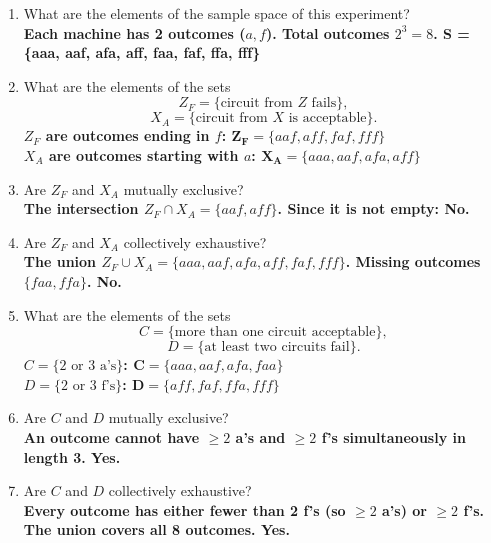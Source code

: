 \documentclass{article}
\begin{document}
\begin{enumerate}[label=(\alph*)]
    \item What are the elements of the sample space of this experiment? \\[1em]
    {\boldmath\textbf{Each machine has 2 outcomes ($a, f$). Total outcomes $2^3 = 8$. S = \{aaa, aaf, afa, aff, faa, faf, ffa, fff\}}}
    
    \item What are the elements of the sets
    \[ Z_F = \{ \text{circuit from } Z \text{ fails} \}, \]
    \[ X_A = \{ \text{circuit from } X \text{ is acceptable} \}. \]
    \vspace{1em}
    {\boldmath\textbf{$Z_F$ are outcomes ending in $f$: $\mathbf{Z_F} = \{aaf, aff, faf, fff\}$}} \\
    {\boldmath\textbf{$X_A$ are outcomes starting with $a$: $\mathbf{X_A} = \{aaa, aaf, afa, aff\}$}}
    
    \item Are $Z_F$ and $X_A$ mutually exclusive? \\[1em]
    {\boldmath\textbf{The intersection $Z_F \cap X_A = \{aaf, aff\}$. Since it is not empty: No.}}
    
    \item Are $Z_F$ and $X_A$ collectively exhaustive? \\[1em]
    {\boldmath\textbf{The union $Z_F \cup X_A = \{aaa, aaf, afa, aff, faf, fff\}$. Missing outcomes $\{faa, ffa\}$. No.}}
    
    \item What are the elements of the sets
    \[ C = \{ \text{more than one circuit acceptable} \}, \]
    \[ D = \{ \text{at least two circuits fail} \}. \]
    \vspace{1em}
    {\boldmath\textbf{$C = \{2 \text{ or } 3 \text{ a's} \}$: $\mathbf{C} = \{aaa, aaf, afa, faa\}$}} \\
    {\boldmath\textbf{$D = \{2 \text{ or } 3 \text{ f's} \}$: $\mathbf{D} = \{aff, faf, ffa, fff\}$}}
    
    \item Are $C$ and $D$ mutually exclusive? \\[1em]
    {\boldmath\textbf{An outcome cannot have $\ge 2$ a's and $\ge 2$ f's simultaneously in length 3. Yes.}}
    
    \item Are $C$ and $D$ collectively exhaustive? \\[1em]
    {\boldmath\textbf{Every outcome has either fewer than 2 f's (so $\ge 2$ a's) or $\ge 2$ f's. The union covers all 8 outcomes. Yes.}}
\end{enumerate}
\end{document}
